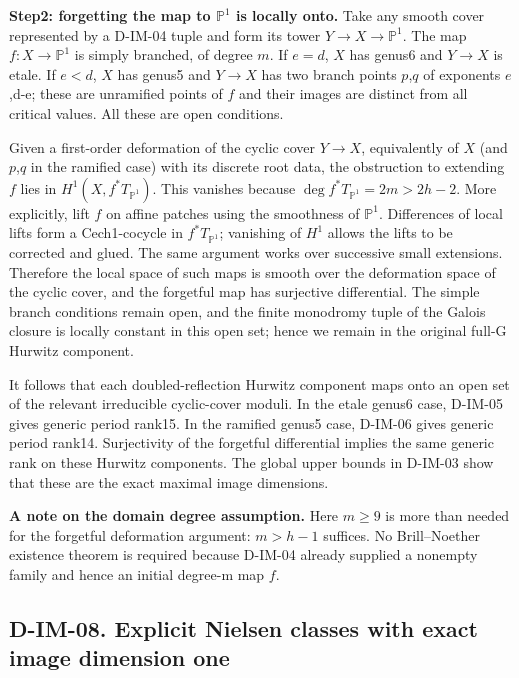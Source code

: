 \textbf{Step2: forgetting the map to \(\mathbb P^1\) is locally onto.} Take any smooth cover represented by a D-IM-04 tuple and form its tower \(Y\to X\to\mathbb P^1\). The map \(f:X\to\mathbb P^1\) is simply branched, of degree \(m\). If \(e= d\), \(X\) has genus6 and \(Y\to X\) is etale. If \(e< d\), \(X\) has genus5 and \(Y\to X\) has two branch points \(p\),\(q\) of exponents \(e\),d-e; these are unramified points of \(f\) and their images are distinct from all critical values. All these are open conditions.

Given a first-order deformation of the cyclic cover \(Y\to X\), equivalently of \(X\) (and \(p\),\(q\) in the ramified case) with its discrete root data, the obstruction to extending \(f\) lies in \(H^1(X,f^*T_{\mathbb P^1})\). This vanishes because \(\deg f^*T_{\mathbb P^1}=2m>2h-2\). More explicitly, lift \(f\) on affine patches using the smoothness of \(\mathbb P^1\). Differences of local lifts form a Cech1-cocycle in \(f^*T_{\mathbb P^1}\); vanishing of \(H^1\) allows the lifts to be corrected and glued. The same argument works over successive small extensions. Therefore the local space of such maps is smooth over the deformation space of the cyclic cover, and the forgetful map has surjective differential. The simple branch conditions remain open, and the finite monodromy tuple of the Galois closure is locally constant in this open set; hence we remain in the original full-G Hurwitz component.

It follows that each doubled-reflection Hurwitz component maps onto an open set of the relevant irreducible cyclic-cover moduli. In the etale genus6 case, D-IM-05 gives generic period rank15. In the ramified genus5 case, D-IM-06 gives generic period rank14. Surjectivity of the forgetful differential implies the same generic rank on these Hurwitz components. The global upper bounds in D-IM-03 show that these are the exact maximal image dimensions.

\textbf{A note on the domain degree assumption.} Here \(m\geq 9\) is more than needed for the forgetful deformation argument: \(m> h-1\) suffices. No Brill--Noether existence theorem is required because D-IM-04 already supplied a nonempty family and hence an initial degree-m map \(f\).

\subsection{D-IM-08. Explicit Nielsen classes with exact image dimension one}
\label{D-IM-08}

